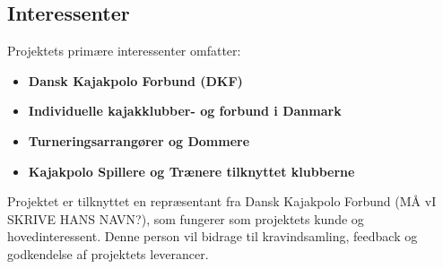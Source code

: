 \subsection{Interessenter}
Projektets primære interessenter omfatter:
\begin{itemize}
    \item \textbf{Dansk Kajakpolo Forbund (DKF)}
    \item \textbf{Individuelle kajakklubber- og forbund i Danmark}
    \item \textbf{Turneringsarrangører og Dommere}
    \item \textbf{Kajakpolo Spillere og Trænere tilknyttet klubberne}
\end{itemize}
Projektet er tilknyttet en repræsentant fra Dansk Kajakpolo Forbund (MÅ vI SKRIVE HANS NAVN?), som fungerer som
projektets kunde og hovedinteressent.
Denne person vil bidrage til kravindsamling, feedback og godkendelse af
projektets leverancer.